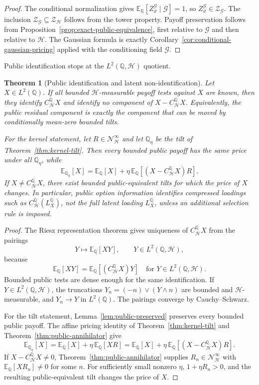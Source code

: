 \documentclass[11pt,a4paper]{amsart}
\theoremstyle{plain}
\newtheorem{theorem}{Theorem}[section]
\theoremstyle{definition}
\theoremstyle{remark}
\newcommand{\QQ}{\mathbb{Q}}
\newcommand{\EE}{\mathbb{E}}
\newcommand{\cG}{\mathcal{G}}
\newcommand{\cH}{\mathcal{H}}
\newcommand{\cN}{\mathcal{N}}
\newcommand{\cZ}{\mathcal{Z}}
\begin{document}
\begin{proof}
The conditional normalization gives
\(\EE_\QQ[Z_\vartheta^{\cG}\mid\cG]=1\), so \(Z_\vartheta^{\cG}\in\cZ_{\cG}\).  The inclusion
\(\cZ_{\cG}\subseteq\cZ_{\cH}\) follows from the tower property.  Payoff preservation follows from
Proposition~\ref{prop:exact-public-equivalence}, first relative to \(\cG\) and then relative to
\(\cH\).  The Gaussian formula is exactly Corollary~\ref{cor:conditional-gaussian-pricing} applied
with the conditioning field \(\cG\).
\end{proof}

Public identification stops at the \(L^2(\QQ,\cH)\) quotient.

\begin{theorem}[Public identification and latent non-identification]\label{thm:identification}
Let \(X\in L^2(\QQ)\).  If all bounded \(\cH\)-measurable payoff tests against \(X\) are known, then
they identify \(C_{\cH}^{\QQ}X\) and identify no component of \(X-C_{\cH}^{\QQ}X\).  Equivalently,
the public residual component is exactly the component that can be moved by conditionally
mean-zero bounded tilts.

For the kernel statement, let \(R\in\cN_{\cH}^{\infty}\) and let \(\QQ_\eta\) be the tilt of
Theorem~\ref{thm:kernel-tilt}.  Then every bounded public payoff has the same price under all
\(\QQ_\eta\), while
\[
        \EE_{\QQ_\eta}[X]
        =
        \EE_\QQ[X]+\eta\,\EE_\QQ[(X-C_{\cH}^{\QQ}X)R].
\]
If \(X\ne C_{\cH}^{\QQ}X\), there exist bounded public-equivalent tilts for which the price of
\(X\) changes.  In particular, public option information identifies compressed loadings such as
\(C_{\cH}^{\QQ}(L_X^\QQ)\), not the full latent loading \(L_X^\QQ\), unless an additional selection
rule is imposed.
\end{theorem}

\begin{proof}
The Riesz representation theorem gives uniqueness of \(C_{\cH}^{\QQ}X\) from the pairings
\[
        Y\mapsto \EE_\QQ[XY],
        \qquad Y\in L^2(\QQ,\cH),
\]
because
\[
        \EE_\QQ[XY]=\EE_\QQ[(C_{\cH}^{\QQ}X)Y]
        \quad\text{for }Y\in L^2(\QQ,\cH).
\]
Bounded public tests are dense enough for the same identification.  If
\(Y\in L^2(\QQ,\cH)\), the truncations \(Y_n=(-n)\vee(Y\wedge n)\) are bounded and
\(\cH\)-measurable, and \(Y_n\to Y\) in \(L^2(\QQ)\).  The pairings converge by
Cauchy--Schwarz.

For the tilt statement, Lemma~\ref{lem:public-preserved} preserves every bounded public payoff.
The affine pricing identity of Theorem~\ref{thm:kernel-tilt} and
Theorem~\ref{thm:public-annihilator} give
\[
        \EE_{\QQ_\eta}[X]
        =
        \EE_\QQ[X]+\eta\,\EE_\QQ[XR]
        =
        \EE_\QQ[X]+\eta\,\EE_\QQ[(X-C_{\cH}^{\QQ}X)R].
\]
If \(X-C_{\cH}^{\QQ}X\ne0\), Theorem~\ref{thm:public-annihilator} supplies
\(R_n\in\cN_{\cH}^{\infty}\) with \(\EE_\QQ[XR_n]\ne0\) for some \(n\).  For sufficiently small
nonzero \(\eta\), \(1+\eta R_n>0\), and the resulting public-equivalent tilt changes the price of
\(X\).
\end{proof}
\end{document}
